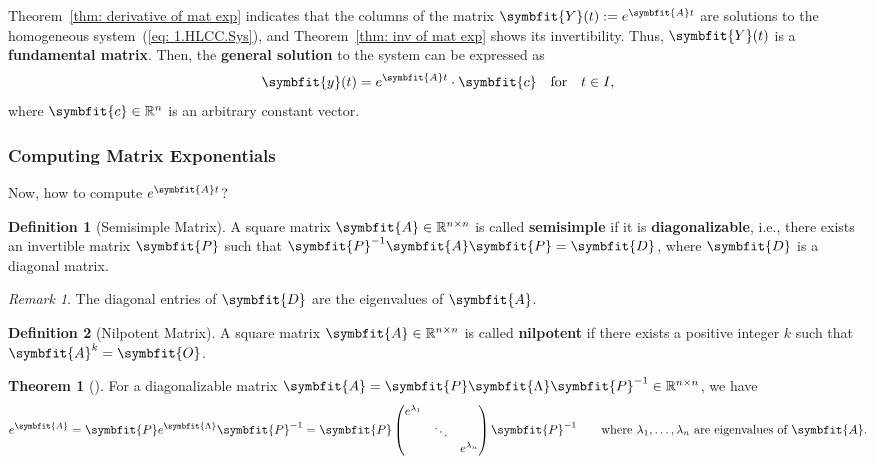 \documentclass[10pt,UTF8]{article}
\newcommand{\mat}[1]{\symbfit{#1}}
\renewcommand{\vec}[1]{%
  \ifnum0\ifcat#1a1\else0\fi>0
  \symbfit{#1}  %
  \else
  \symbf{#1}  %
  \fi
}
\newenvironment{definitionBox}
{ \bigskip
  \begin{tcolorbox}[colback=blue!5!white,colframe=blue!75!black,parbox=false,before
  upper=\par,before lower=\par]}
  {
\end{tcolorbox}}
\newenvironment{theoremBox}
{ \bigskip
  \begin{tcolorbox}[colback=yellow!5!white,colframe=yellow!75!black,parbox=false,before
  upper=\par,before lower=\par]}
  {
\end{tcolorbox}}
\theoremstyle{definition}
\newtheorem{definition inner}{Definition}[section]
\newenvironment{definition}[1][]
{
  \begin{definitionBox}
  \begin{definition inner}[#1]\hfill\par}
    {
    \end{definition inner}
\end{definitionBox}}
\theoremstyle{definition}
\newtheorem{theorem inner}{Theorem}[section]
\newenvironment{theorem}[1][]
{
  \begin{theoremBox}
  \begin{theorem inner}[#1]\hfill\par}
    {
    \end{theorem inner}
\end{theoremBox}}
\theoremstyle{definition}
\newtheorem*{proof inner}{\textit{Proof}}
\theoremstyle{plain}
\newtheorem{tip inner}{Tip}[section]
\theoremstyle{remark}
\newtheorem*{remark}{\textit{Remark}}
\begin{document}
Theorem~\ref{thm: derivative of mat exp} indicates that the columns of
the matrix \(\mat{Y}(t) := e^{\mat{A} t}\) are solutions
to the homogeneous system~(\ref{eq: 1.HLCC.Sys}),
and Theorem~\ref{thm: inv of mat exp} shows its invertibility.
Thus, \(\mat{Y}(t)\) is a \textbf{fundamental matrix}.
Then, the \textbf{general solution} to the system can be expressed as
\begin{equation*}
  \vec{y}(t) = e^{\mat{A} t} \cdot \vec{c} \qfor t\in I,
\end{equation*}
where \(\vec{c} \in \mathbb{R}^n\) is an arbitrary constant vector.

\subsubsection{Computing Matrix Exponentials}

Now, how to compute \(e^{\mat{A} t}\)?

\begin{definition}[Semisimple Matrix]
  A square matrix \(\mat{A} \in \mathbb{R}^{n \times n}\)
  is called \textbf{semisimple}
  if it is \textbf{diagonalizable}, i.e.,
  there exists an invertible matrix \(\mat{P}\) such that
  \(\mat{P}^{-1} \mat{A} \mat{P} = \mat{D}\),
  where \(\mat{D}\) is a diagonal matrix.
\end{definition}
\begin{remark}
  The diagonal entries of \(\mat{D}\) are the eigenvalues of \(\mat{A}\).
\end{remark}

\begin{definition}[Nilpotent Matrix]
  A square matrix \(\mat{A} \in \mathbb{R}^{n \times n}\)
  is called \textbf{nilpotent}
  if there exists a positive integer \(k\) such that
  \(\mat{A}^k = \mat{O}\).
\end{definition}

\begin{theorem}
  {}\label{thm: exp of a diagonalizable matrix}
  For a diagonalizable matrix
  \(\mat{A} = \mat{P} \mat{\Lambda} \mat{P}^{-1} \in \mathbb{R}^{n \times n}\),
  we have
  \begin{equation*}
    e^{\mat{A}} = \mat{P} e^{\mat{\Lambda}} \mat{P}^{-1}
    = \mat{P}
    \begin{pmatrix}
      e^{\lambda_1} & & \\ & \ddots & \\ & & e^{\lambda_n}
    \end{pmatrix}
    \mat{P}^{-1}
    \qquad\text{where }
    \lambda_1, \ldots, \lambda_n \text{ are eigenvalues of } \mat{A}.
  \end{equation*}
\end{theorem}
\end{document}
